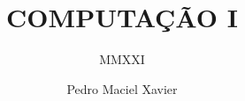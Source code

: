 \documentclass[br]{textbook}
\title{COMPUTAÇÃO I}
\author{Pedro Maciel Xavier}
\subtitle{MMXXI}
\begin{document}
    \frontmatter
    \titlepage
    
    
    \titlepage

    \mainmatter
    \tableofcontents
    

    \backmatter
    \appendix
    
    
\end{document}
